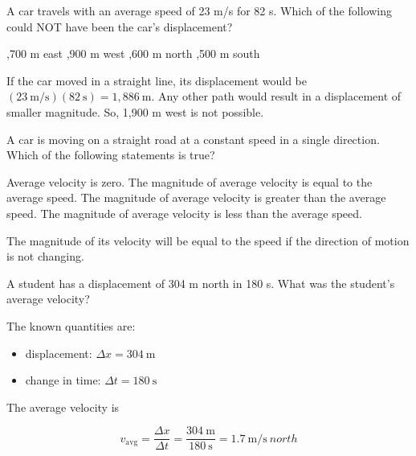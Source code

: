 \documentclass[addpoints]{exam}
\begin{document}
\begin{questions}
\question
A car travels with an average speed of 23 m/s for 82 s. Which of the following could NOT have been the car's displacement?

\begin{choices}
,700 m east
,900 m west
,600 m north
,500 m south
\end{choices}

\begin{solution}
If the car moved in a straight line, its displacement would be $(23\ \mathrm{m/s})(82\ \mathrm{s}) = 1,886\ \mathrm{m}$. Any other path would result in a displacement of smaller magnitude. So, 1,900 m west is not possible.
\end{solution}

\question 
A car is moving on a straight road at a constant speed in a single direction. Which of the following statements is true?

\begin{choices}
\choice Average velocity is zero.
\CorrectChoice The magnitude of average velocity is equal to the average speed.
\choice The magnitude of average velocity is greater than the average speed.
\choice The magnitude of average velocity is less than the average speed.
\end{choices}

\begin{solution}
The magnitude of its velocity will be equal to the speed if the direction of motion is not changing.
\end{solution}


\question
A student has a displacement of 304 m north in 180 s. What was the student's average velocity?

\begin{solution}
The known quantities are:

\begin{itemize}
    \item displacement: $\Delta{x} = \SI{304}{\meter}$
    \item change in time: $\Delta{t} = \SI{180}{\second}$
\end{itemize}

The average velocity is

\begin{equation*}
    v_{\mathrm{avg}} = \frac{\Delta{x}}{\Delta{t}} = \frac{\SI{304}{\meter}}{\SI{180}{\second}} = \SI[per-mode=symbol]{1.7}{\meter\per\second\ north}
\end{equation*}
\end{solution}




\end{questions}
\end{document}
